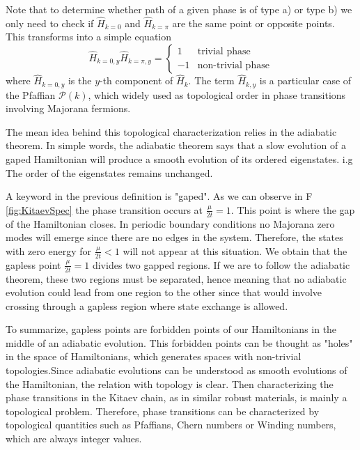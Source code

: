 Note that to determine whether path of a given phase is of type a) or type b) we only need to check if $\hat{H}_{k=0}$ and $\hat{H}_{k=\pi}$ are the same point or opposite points. This transforms into a simple equation 
\begin{equation}
    \hat{H}_{k=0,y}\hat{H}_{k=\pi,y}=\begin{cases}
1 & \mbox{trivial phase}\\
-1 & \mbox{non-trivial phase}
\end{cases}
\end{equation}
\noindent where $\hat{H}_{k=0,y}$ is the $y$-th component of $\hat{H}_{k}$. The term $\hat{H}_{k,y}$ is a particular case of the Pfaffian $\mathcal{P}(k)$, which widely used as topological order in phase transitions involving  Majorana fermions. 



The mean idea behind this topological characterization relies in the adiabatic theorem.  In simple words, the adiabatic theorem says that a slow evolution of a gaped Hamiltonian will produce a smooth evolution of its ordered eigenstates. i.g The order of the eigenstates remains unchanged. 

A keyword in the previous definition is "gaped". As we can observe in F \ref{fig:KitaevSpec} the phase transition occurs at $\frac{\mu}{2t}=1$. This point is where  the gap of the Hamiltonian closes. In periodic boundary conditions no Majorana zero modes will emerge since there are no edges in the system. Therefore, the states with zero energy for $\frac{\mu}{2t}<1$ will not appear at this situation. We obtain that the gapless point $\frac{\mu}{2t}=1$ divides two gapped regions. If we are to follow the adiabatic theorem, these two regions must be separated, hence meaning that no adiabatic evolution could lead from one region to the other since that would involve crossing  through a gapless region where state exchange is allowed.  


To summarize, gapless points are forbidden points of our Hamiltonians in the middle of an adiabatic evolution. This forbidden points can be thought as "holes" in the space of Hamiltonians, which generates spaces with non-trivial topologies.Since adiabatic evolutions can be understood as smooth evolutions of the Hamiltonian, the relation with topology is clear.  Then characterizing the phase transitions in the Kitaev chain, as in similar robust materials,  is mainly a topological problem. Therefore, phase transitions can be characterized by topological quantities such as Pfaffians, Chern numbers or Winding numbers, which are always integer values. 

